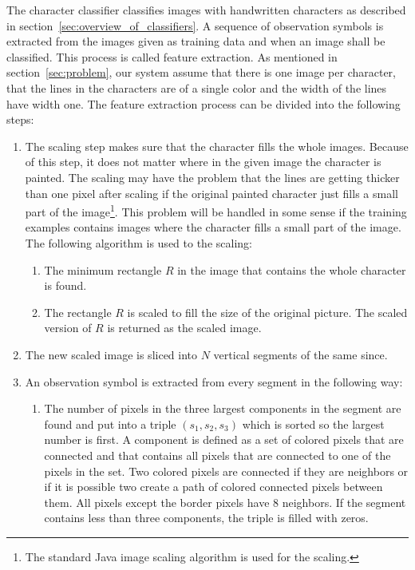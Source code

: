 
The character classifier classifies images with handwritten characters as described in section~\ref{sec:overview_of_classifiers}. A sequence of observation symbols is extracted from the images given as training data and when an image shall be classified. This process is called feature extraction. As mentioned in section~\ref{sec:problem}, our system assume that there is one image per character, that the lines in the characters are of a single color and the width of the lines have width one. The feature extraction process can be divided into the following steps:

\begin{enumerate}
  \item The scaling step makes sure that the character fills the whole images. Because of this step, it does not matter where in the given image the character is painted. The scaling may have the problem that the lines are getting thicker than one pixel after scaling if the original painted character just fills a small part of the image\footnote{The standard Java image scaling algorithm is used for the scaling.}. This problem will be handled in some sense if the training examples contains images where the character fills a small part of the image. The following algorithm is used to the scaling:
  \begin{enumerate}
    \item The minimum rectangle $R$ in the image that contains the whole character is found.
    \item The rectangle $R$ is scaled to fill the size of the original picture. The scaled version of $R$ is returned as the scaled image.
  \end{enumerate}
  \item The new scaled image is sliced into $N$ vertical segments of the same since.
  \item An observation symbol is extracted from every segment in the following way:
  \begin{enumerate}
    \item The number of pixels in the three largest components in the segment are found and put into a triple $(s_{1},s_{2},s_{3})$ which is sorted so the largest number is first. A component is defined as a set of colored pixels that are connected and that contains all pixels that are connected to one of the pixels in the set. Two colored pixels are connected if they are neighbors or if it is possible two create a path of colored connected pixels between them. All pixels except the border pixels have 8 neighbors. If the segment contains less than three components, the triple is filled with zeros.

\end{enumerate}
\end{enumerate}
